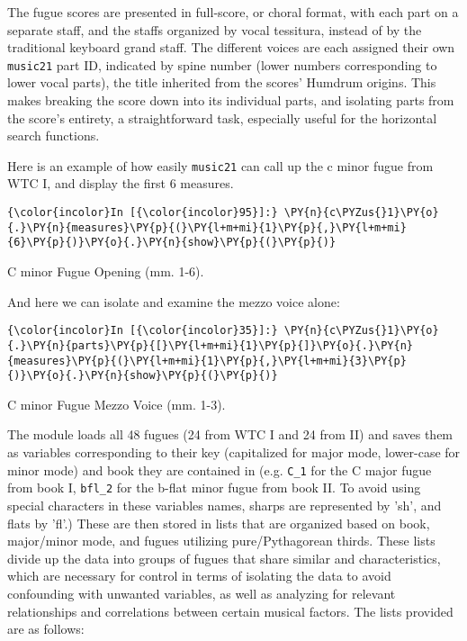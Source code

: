 The fugue scores are presented in full-score, or choral format, with
each part on a separate staff, and the staffs organized by vocal
tessitura, instead of by the traditional keyboard grand staff. The
different voices are each assigned their own \texttt{music21} part ID,
indicated by spine number (lower numbers corresponding to lower vocal
parts), the title inherited from the scores' Humdrum origins. This makes
breaking the score down into its individual parts, and isolating parts
from the score's entirety, a straightforward task, especially useful for
the horizontal search functions.

Here is an example of how easily \texttt{music21} can call up the c
minor fugue from WTC I, and display the first 6 measures.


    \begin{Verbatim}[commandchars=\\\{\}]
{\color{incolor}In [{\color{incolor}95}]:} \PY{n}{c\PYZus{}1}\PY{o}{.}\PY{n}{measures}\PY{p}{(}\PY{l+m+mi}{1}\PY{p}{,}\PY{l+m+mi}{6}\PY{p}{)}\PY{o}{.}\PY{n}{show}\PY{p}{(}\PY{p}{)}
\end{Verbatim}

\begin{Example}[H]
\vspace{1.5em}
    \centering
    \caption{ C minor Fugue Opening (mm. 1-6). }
\end{Example}    
    And here we can isolate and examine the mezzo voice alone:


    \begin{Verbatim}[commandchars=\\\{\}]
{\color{incolor}In [{\color{incolor}35}]:} \PY{n}{c\PYZus{}1}\PY{o}{.}\PY{n}{parts}\PY{p}{[}\PY{l+m+mi}{1}\PY{p}{]}\PY{o}{.}\PY{n}{measures}\PY{p}{(}\PY{l+m+mi}{1}\PY{p}{,}\PY{l+m+mi}{3}\PY{p}{)}\PY{o}{.}\PY{n}{show}\PY{p}{(}\PY{p}{)}
\end{Verbatim}

\begin{Example}[H]
\vspace{1.5em}
    \centering
    \caption{ C minor Fugue Mezzo Voice (mm. 1-3). }
\end{Example}    
    The module loads all 48 fugues (24 from WTC I and 24 from II) and saves
them as variables corresponding to their key (capitalized for major
mode, lower-case for minor mode) and book they are contained in (e.g.
\texttt{C\_1} for the C major fugue from book I, \texttt{bfl\_2} for the
b-flat minor fugue from book II. To avoid using special characters in
these variables names, sharps are represented by 'sh', and flats by
'fl'.) These are then stored in lists that are organized based on book,
major/minor mode, and fugues utilizing pure/Pythagorean thirds. These
lists divide up the data into groups of fugues that share similar and
characteristics, which are necessary for control in terms of isolating
the data to avoid confounding with unwanted variables, as well as
analyzing for relevant relationships and correlations between certain
musical factors. The lists provided are as follows:


